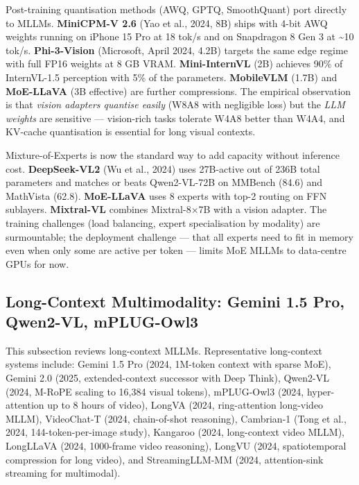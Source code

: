 Post-training quantisation methods (AWQ, GPTQ, SmoothQuant) port directly to MLLMs. \textbf{MiniCPM-V 2.6} (Yao et al., 2024, 8B) ships with 4-bit AWQ weights running on iPhone 15 Pro at 18 tok/s and on Snapdragon 8 Gen 3 at \textasciitilde10 tok/s. \textbf{Phi-3-Vision} (Microsoft, April 2024, 4.2B) targets the same edge regime with full FP16 weights at 8 GB VRAM. \textbf{Mini-InternVL} (2B) achieves 90\% of InternVL-1.5 perception with 5\% of the parameters. \textbf{MobileVLM} (1.7B) and \textbf{MoE-LLaVA} (3B effective) are further compressions. The empirical observation is that \emph{vision adapters quantise easily} (W8A8 with negligible loss) but the \emph{LLM weights} are sensitive --- vision-rich tasks tolerate W4A8 better than W4A4, and KV-cache quantisation is essential for long visual contexts.

Mixture-of-Experts is now the standard way to add capacity without inference cost. \textbf{DeepSeek-VL2} (Wu et al., 2024) uses 27B-active out of 236B total parameters and matches or beats Qwen2-VL-72B on MMBench (84.6) and MathVista (62.8). \textbf{MoE-LLaVA} uses 8 experts with top-2 routing on FFN sublayers. \textbf{Mixtral-VL} combines Mixtral-8×7B with a vision adapter. The training challenges (load balancing, expert specialisation by modality) are surmountable; the deployment challenge --- that all experts need to fit in memory even when only some are active per token --- limits MoE MLLMs to data-centre GPUs for now.

\subsection{Long-Context Multimodality: Gemini 1.5 Pro, Qwen2-VL, mPLUG-Owl3}\label{long-context-multimodality-gemini-1.5-pro-qwen2-vl-mplug-owl3}

This subsection reviews long-context MLLMs. Representative long-context systems include: Gemini 1.5 Pro (2024, 1M-token context with sparse MoE), Gemini 2.0 (2025, extended-context successor with Deep Think), Qwen2-VL (2024, M-RoPE scaling to 16,384 visual tokens), mPLUG-Owl3 (2024, hyper-attention up to 8 hours of video), LongVA (2024, ring-attention long-video MLLM), VideoChat-T (2024, chain-of-shot reasoning), Cambrian-1 (Tong et al., 2024, 144-token-per-image study), Kangaroo (2024, long-context video MLLM), LongLLaVA (2024, 1000-frame video reasoning), LongVU (2024, spatiotemporal compression for long video), and StreamingLLM-MM (2024, attention-sink streaming for multimodal).

